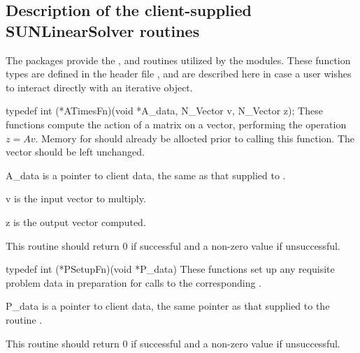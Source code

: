 \subsection{Description of the client-supplied SUNLinearSolver routines}\label{ss:sunlinsol_clientsupplied}

The {\sundials} packages provide the , 
and  routines utilized by the {\sunlinsol} modules.  These
function types are defined in the header
file , and are described here in
case a user wishes to interact directly with an iterative {\sunlinsol}
object. 



{
  typedef int (*ATimesFn)(void *A\_data, N\_Vector v, N\_Vector z);
}
{
  These functions compute the action of a matrix on a vector,
  performing the operation $z = Av$.  Memory for  should already be
  allocted prior to calling this function.  The vector  should
  be left unchanged.  
}
{
  \begin{args}
  \item[A\_data]
    is a pointer to client data, the same as that supplied to .
  \item[v]
    is the input vector to multiply.
  \item[z]
    is the output vector computed.
  \end{args}
}
{  
  This routine should return 0 if successful and a         
  non-zero value if unsuccessful.
}
{
}



{
  typedef int (*PSetupFn)(void *P\_data)
}
{
  These functions set up any requisite problem data in preparation
  for calls to the corresponding . 
}
{
  \begin{args}
  \item[P\_data]
    is a pointer to client data, the same pointer as that supplied to the routine 
    .
  \end{args}
}
{  
  This routine should return 0 if successful and a non-zero value if unsuccessful. 
}
{
}


